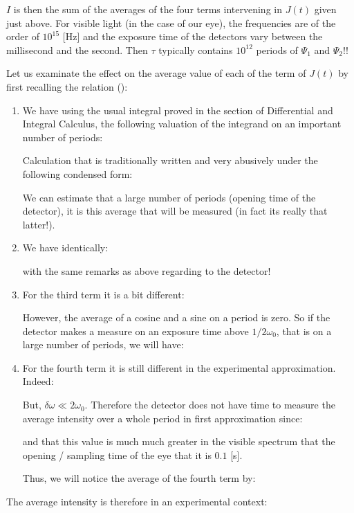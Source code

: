 	$I$ is then the sum of the averages of the four terms intervening in $J(t)$ given just above. For visible light (in the case of our eye), the frequencies are of the order of $10^{15}$ [Hz] and the exposure time of the detectors vary between the millisecond and the second. Then $\tau$ typically contains $10^{12}$ periods of $\Psi_1$ and $\Psi_2$!!

	Let us examinate the effect on the average value of each of the term of $J (t)$ by first recalling the relation ():
	
	\begin{enumerate}
		\item We have using the usual integral proved in the section of Differential and Integral Calculus, the following valuation of the integrand on an important number of periods:
		
		Calculation that is traditionally written and very abusively under the following condensed form:
		
		We can estimate that a large number of periods (opening time of the detector), it is this average that will be measured (in fact its really that latter!).
		
		\item  We have identically:
		
		with the same remarks as above regarding to the detector!
	
		\item For the third term it is a bit different:
		
		However, the average of a cosine and a sine on a period is zero. So if the detector makes a measure on an exposure time above $1/2\omega_0$, that is on a large number of periods, we will have:
		
		
		\item For the fourth term it is still different in the experimental approximation. Indeed:
		
		But, $\delta\omega \ll 2\omega_0$. Therefore the detector does not have time to measure the average intensity over a whole period in first approximation since:
		
		and that this value is much much greater in the visible spectrum that the opening / sampling time of the eye that it is $0.1$ [s].
	
		Thus, we will notice the average of the fourth term by:
		
	\end{enumerate}
	The average intensity is therefore in an experimental context:
	
